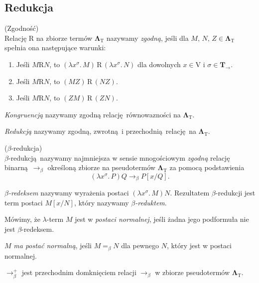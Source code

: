 \subsection{Redukcja}
\begin{definicja}(Zgodność)\\
  Relację \(\mathrm{R}\) na zbiorze termów \(\mathbf{\Lambda}_{\mathrm{T}}\) nazywamy \emph{zgodną}, jeśli dla \(M,\,N,\,Z\in\mathbf{\Lambda}_{\mathrm{T}}\) spełnia ona następujące warunki:
  \begin{enumerate}[label=\roman*)]
    \item Jeśli \(M\mathrm{R} N\), to \((\lambda x^\sigma.\,M)\, \mathrm{R}\, (\lambda x^\sigma.\, N)\) dla dowolnych \(x\in \mathrm{V}\) i \(\sigma\in \mathbf{T_\to}\).
    \item Jeśli \(M\mathrm{R} N\), to \((MZ)\,\mathrm{R}\, (NZ)\).
    \item Jeśli \(M\mathrm{R} N\), to \((ZM)\,\mathrm{R}\, (ZN)\).
  \end{enumerate}

  \noindent \emph{Kongruencją} nazywamy zgodną relację równowazności na \(\mathbf{\Lambda}_{\mathrm{T}}\).

  \noindent \emph{Redukcją} nazywamy zgodną, zwrotną i przechodnią relację na \(\mathbf{\Lambda}_{\mathrm{T}}\).
\end{definicja}

\begin{definicja}(\(\beta\)-redukcja)\\
  \(\beta\)-redukcją nazywamy najmniejsza w sensie mnogościowym \emph{zgodną} relację binarną \(\longrightarrow_{\beta}\) określoną zbiorze na pseudotermów \(\mathbf{\Lambda}_{\mathrm{T}}\) za pomocą podstawienia
  \[
    (\lambda x^\sigma.\,P)Q \longrightarrow_{\beta} P[x/Q].
  \]
  
  \noindent \emph{\(\beta\)-redeksem} nazywamy wyrażenia postaci \((\lambda x^\sigma.\, M)N\). Rezultatem \(\beta\)-redukcji jest term postaci \(M[x/N]\), który nazywamy \emph{\(\beta\)-reduktem}.
\end{definicja}

    Mówimy, że \(\lambda\)-term \(M\) jest w \emph{postaci normalnej}, jeśli żadna jego podformuła nie jest \(\beta\)-redeksem. 
    
    \(M\) \emph{ma postać normalną}, jeśli \(M=_{\beta}N\) dla pewnego \(N\), który jest w postaci normalnej.


    \(\longrightarrow^{+}_{\beta}\) jest przechodnim domknięciem relacji \(\longrightarrow_{\beta}\) w zbiorze pseudotermów \(\mathbf{\Lambda}_{\mathrm{T}}\).

